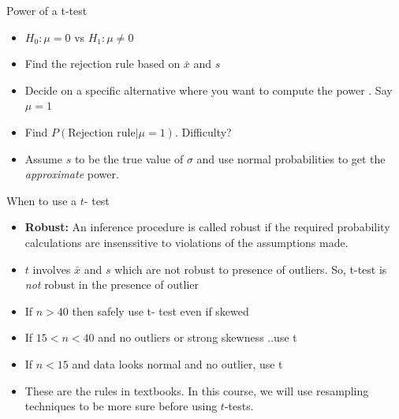 \documentclass{beamer}\usepackage[]{graphicx}\usepackage[]{color}
\begin{document}
\begin{frame}{Power of a t-test}

\begin{itemize}
\item $H_0: \mu=0$ vs $H_1: \mu \neq 0$ \pause
\item Find the rejection rule based on $\bar{x}$ and $s$ \pause
\item Decide on a specific alternative where you want to compute the power . Say $\mu=1$ \pause
\item Find $P( \text{Rejection rule} | \mu=1)$. Difficulty? \pause
\item Assume $s$ to be the true value of $\sigma$ and use normal probabilities to get the \textit{approximate} power.
\end{itemize}
\end{frame}

\begin{frame}{When to use a $t$- test}

\begin{itemize}
\item  \textbf{Robust:} An inference procedure is called robust if the required probability calculations are insenssitive to violations of the assumptions made. \pause
\item $t$ involves $\bar{x}$ and $s$ which are not robust to presence of outliers. So, t-test is \textit{not} robust in the presence of outlier \pause
\item  If $n>40$ then safely use t- test even if skewed \pause
\item If $15<n<40$ and no outliers or strong skewness ..use t \pause
\item If $n<15$ and data looks normal and no outlier, use t \pause
\item These are the rules in textbooks. In this course, we will use resampling techniques to be more sure before using $t$-tests.


\end{itemize}
\end{frame}
\end{document}
